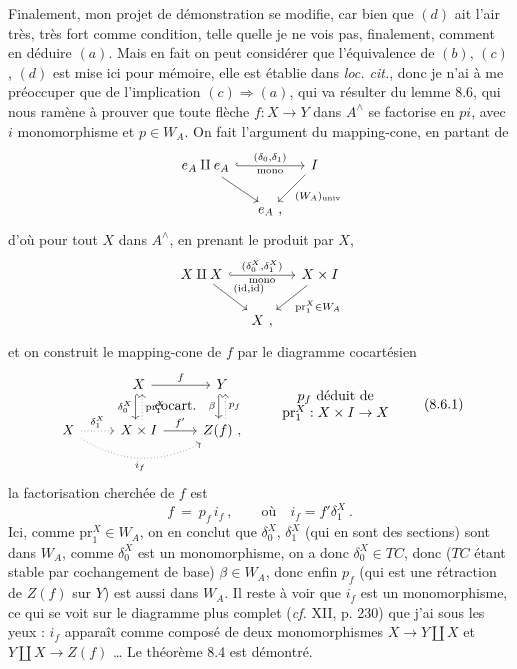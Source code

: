 \documentclass[11pt]{article}
\newcommand{\printedpage}[1]{\marginpar{\footnotesize p.~#1}}
\newcommand{\msp}[1]{\marginpar{\footnotesize [#1]}}
\begin{document}
Finalement, mon projet de démonstration se modifie, car bien que $(d)$ ait l'air très, très fort comme condition, telle quelle je ne vois pas, finalement, comment en déduire $(a)$. Mais en fait on peut considérer que l'équivalence de $(b)$, $(c)$, $(d)$ est mise ici pour mémoire, elle est établie dans \textit{loc. cit.}, donc je n'ai à me préoccuper que de l'implication $(c) \Longrightarrow (a)$, qui va résulter
\msp{page 111}
du lemme 8.6, qui nous ramène à prouver que toute flèche $f : X \longrightarrow Y$ dans $A^\wedge$ se factorise en $pi$, avec $i$ monomorphisme et $p \in W_A$. On fait l'argument du mapping-cone, en partant de
\[
\begin{tikzcd}[column sep=small]
e_A \amalg e_A \arrow[rr, hook, "{(\delta_0,\delta_1)}", "\text{mono}"'] \arrow[dr] & & I \arrow[dl, "(W_A)_{\mathrm{univ}}"] \\
& e_A\ , &
\end{tikzcd}
\]
d'où pour tout $X$ dans $A^\wedge$, en prenant le produit par $X$,
\[
\begin{tikzcd}[column sep=small]
X \amalg X \arrow[rr, hook, "{(\delta_0^X,\delta_1^X)}", "\text{mono}"'] \arrow[dr, "{(\mathrm{id},\mathrm{id})}"] & & X \times I \arrow[dl, "\mathrm{pr}_1^X \in W_A"] \\
& X\ , &
\end{tikzcd}
\]
\printedpage{61}
et on construit le mapping-cone de $f$ par le diagramme cocartésien
\[
\begin{tikzcd}
 & X \arrow[r, "f"] \arrow[d, hook, shift right, "\delta_0^X"'] \arrow[dr, phantom, "\text{cocart.}"] & Y \arrow[d, hook, shift right, "\beta"'] \\
X \arrow[r, dotted, "\delta_1^X"] \arrow[rr, dotted, bend right, "i_f"'] & X \times I \arrow[r, "f'"] \arrow[u, dotted, shift right, "\mathrm{pr}_1^X"'] & Z(f)\ , \arrow[u, dotted, shift right, "p_f"']
\end{tikzcd}
\qquad
\begin{array}{c}
p_f \text{ déduit de} \\
\mathrm{pr}_1^X : X \times I \to X
\end{array}
\tag*{(8.6.1)}
\]
la factorisation cherchée de $f$ est
\[
f \ = \ p_f\, i_f\ , \qquad \text{où}\quad i_f = f'\delta_1^X\ .
\]
Ici, comme $\mathrm{pr}_1^X \in W_A$, on en conclut que
\msp{page 112}
$\delta_0^X$, $\delta_1^X$ (qui en sont des sections) sont dans $W_A$, comme $\delta_0^X$ est un monomorphisme, on a donc $\delta_0^X \in TC$, donc ($TC$ étant stable par cochangement de base) $\beta \in W_A$, donc enfin $p_f$ (qui est une rétraction de $Z(f)$ sur $Y$) est aussi dans $W_A$. Il reste à voir que $i_f$ est un monomorphisme, ce qui se voit sur le diagramme plus complet (\textit{cf.} XII, p. 230) que j'ai sous les yeux : $i_f$ apparaît comme composé de deux monomorphismes $X \longrightarrow Y \amalg X$ et $Y \amalg X \longrightarrow Z(f)$ \ldots{} Le théorème 8.4 est démontré.
\end{document}
